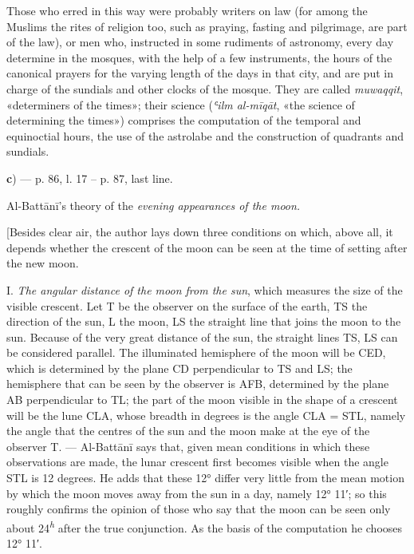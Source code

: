 \documentclass[11pt]{article}
\newcommand{\Pg}[1]{\marginpar{\footnotesize\color{gray}#1}}
\begin{document}
\par Those who erred in this way were probably writers on law (for among the Muslims the rites of religion too, such as praying, fasting and pilgrimage, are part of the law), or men who, instructed in some rudiments of astronomy, every day determine in the mosques, with the help of a few instruments, the hours of the canonical prayers for the varying length of the days in that city, and are put in charge of the sundials and other clocks of the mosque. They are called \emph{muwaqqit}, «determiners of the times»; their science (\emph{ʿilm al-mīqāt}, «the science of determining the times») comprises the computation of the temporal and equinoctial hours, the use of the astrolabe and the construction of quadrants and sundials.\par
\par\begin{center}\textbf{c}) — p. 86, l. 17 – p. 87, last line.\end{center}
\par Al-Battānī's theory of the \emph{evening appearances of the moon.}\par
\par [Besides clear air, the author lays down three conditions on which, above all, it depends whether the crescent of the moon can be seen at the time of setting after the new moon.\par
\par \Pg{I 267}I. \emph{The angular distance of the moon from the sun}, which measures the size of the visible crescent. Let T be the observer on the surface of the earth, TS the direction of the sun, L the moon, LS the straight line that joins the moon to the sun. Because of the very great distance of the sun, the straight lines TS, LS can be considered parallel. The illuminated hemisphere of the moon will be CED, which is determined by the plane CD perpendicular to TS and LS; the hemisphere that can be seen by the observer is AFB, determined by the plane AB perpendicular to TL; the part of the moon visible in the shape of a crescent will be the lune CLA, whose breadth in degrees is the angle CLA = STL, namely the angle that the centres of the sun and the moon make at the eye of the observer T. — Al-Battānī says that, given mean conditions in which these observations are made, the lunar crescent first becomes visible when the angle STL is 12 degrees. He adds that these 12° differ very little from the mean motion by which the moon moves away from the sun in a day, namely 12° 11′; so this roughly confirms the opinion of those who say that the moon can be seen only about 24\textsuperscript{\itshape h} after the true conjunction. As the basis of the computation he chooses 12° 11′.\par
\end{document}
